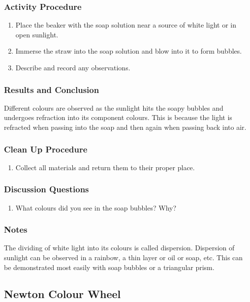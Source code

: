 \subsubsection*{Activity Procedure}
\begin{enumerate}
\item{Place the beaker with the soap solution near a source of white light or in open sunlight.} 
\item{Immerse the straw into the soap solution and blow into it to form bubbles.} 
\item{Describe and record any observations.} 
\end{enumerate}

\subsubsection*{Results and Conclusion}
Different colours are observed as the sunlight hits the soapy bubbles and undergoes refraction into its component colours.  This is because the light is refracted when passing into the soap and then again when passing back into air.

\subsubsection*{Clean Up Procedure}
\begin{enumerate}
\item{Collect all materials and return them to their proper place.} 
\end{enumerate}

\subsubsection*{Discussion Questions}
\begin{enumerate}
\item{What colours did you see in the soap bubbles? Why?}
\end{enumerate}

\subsubsection*{Notes}
The dividing of white light into its colours is called dispersion.  Dispersion of sunlight can be observed in a rainbow, a thin layer or oil or soap, etc.  This can be demonstrated most easily with soap bubbles or a triangular prism.

\subsection{Newton Colour Wheel}

